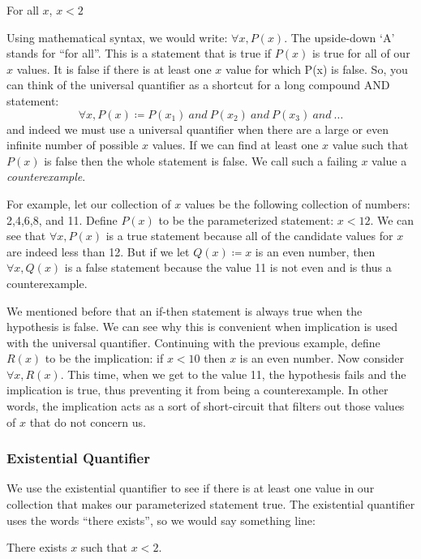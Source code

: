 \documentclass[letterpaper,12pt,fleqn]{article}
\begin{document}
\hspace{0.5in}For all $x$, $x<2$

Using mathematical syntax, we would write: $\forall x, P(x)$. The upside-down
`A' stands for ``for all''. This is a statement that is true if $P(x)$ is true
for all of our $x$ values. It is false if there is at least one $x$ value for
which P(x) is false. So, you can think of the universal quantifier as a
shortcut for a long compound AND statement:
\[\forall x,P(x)\coloneqq P(x_1)\ and\ P(x_2)\ and\ P(x_3)\ and\ \ldots\]
and indeed we must use a universal quantifier when there are a large or even
infinite number of possible $x$ values. If we can find at least one $x$ value
such that $P(x)$ is false then the whole statement is false. We call such a
failing $x$ value a \emph{counterexample}.

For example, let our collection of $x$ values be the following collection of
numbers: 2,4,6,8, and 11. Define $P(x)$ to be the parameterized statement:
$x<12$. We can see that $\forall x,P(x)$ is a true statement because all of the
candidate values for $x$ are indeed less than 12. But if we let
$Q(x)\coloneqq x$ is an even number, then $\forall x,Q(x)$ is a false
statement because the value 11 is not even and is thus a counterexample.

We mentioned before that an if-then statement is always true when the
hypothesis is false. We can see why this is convenient when implication is used
with the universal quantifier. Continuing with the previous example, define
$R(x)$ to be the implication: if $x<10$ then $x$ is an even number. Now
consider $\forall x,R(x)$. This time, when we get to the value 11, the
hypothesis fails and the implication is true, thus preventing it from being a
counterexample. In other words, the implication acts as a sort of short-circuit
that filters out those values of $x$ that do not concern us.

\newpage

\subsubsection*{Existential Quantifier}

We use the existential quantifier to see if there is at least one value in our
collection that makes our parameterized statement true. The existential
quantifier uses the words ``there exists'', so we would say something line:

\hspace{0.5in}There exists $x$ such that $x<2$.
\end{document}
